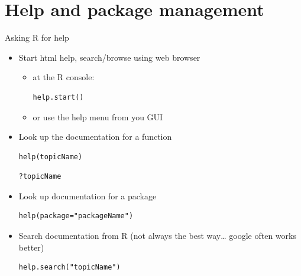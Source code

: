 \documentclass[table,smaller]{beamer}
\begin{document}
\section{Help and package management}
\label{sec-4}

\begin{frame}[fragile,label=sec-4-1]{Asking R for help}
 \begin{itemize}
\item Start html help, search/browse using web browser
\begin{itemize}
\item at the R console:
\begin{verbatim}
help.start()
\end{verbatim}

\item or use the help menu from you GUI
\end{itemize}

\item Look up the documentation for a function
\begin{verbatim}
help(topicName)
\end{verbatim}

\begin{verbatim}
?topicName
\end{verbatim}

\item Look up documentation for a package
\begin{verbatim}
help(package="packageName")
\end{verbatim}

\item Search documentation from R (not always the best way\ldots{} google often works better)
\begin{verbatim}
help.search("topicName")
\end{verbatim}
\end{itemize}
\end{frame}
\end{document}
